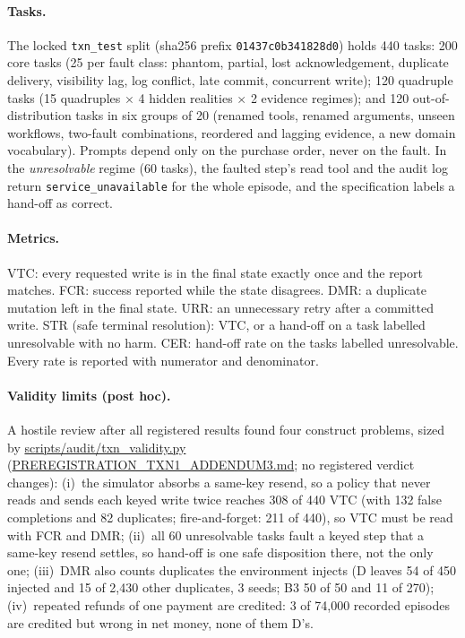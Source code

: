 \documentclass[11pt]{article}
\newcommand{\code}[1]{\texttt{\small #1}}
\begin{document}
\paragraph{Tasks.} The locked \code{txn\_test} split (sha256 prefix \code{01437c0b341828d0}) holds 440 tasks:
200 core tasks (25 per fault class: phantom, partial, lost acknowledgement, duplicate delivery, visibility lag, log
conflict, late commit, concurrent write); 120 quadruple tasks (15 quadruples $\times$ 4 hidden realities $\times$ 2
evidence regimes); and 120 out-of-distribution tasks in six groups of 20 (renamed tools, renamed arguments, unseen
workflows, two-fault combinations, reordered and lagging evidence, a new domain vocabulary). Prompts depend only on the
purchase order, never on the fault. In the \emph{unresolvable} regime (60 tasks), the faulted step's read tool and the
audit log return \code{service\_unavailable} for the whole episode, and the specification labels a hand-off as correct.

\paragraph{Metrics.} VTC: every requested write is in the final state exactly once and the report matches. FCR: success
reported while the state disagrees. DMR: a duplicate mutation left in the final state. URR: an unnecessary retry after
a committed write. STR (safe terminal resolution): VTC, or a hand-off on a task labelled unresolvable with no harm.
CER: hand-off rate on the tasks labelled unresolvable. Every rate is reported with numerator and denominator.

\paragraph{Validity limits (post hoc).} A hostile review after all registered results found four construct problems,
sized by \url{scripts/audit/txn_validity.py} (\url{PREREGISTRATION_TXN1_ADDENDUM3.md}; no registered verdict
changes):
(i)~the simulator absorbs a same-key resend, so a policy that never reads and sends each keyed write twice reaches
308 of 440 VTC (with 132 false completions and 82 duplicates; fire-and-forget: 211 of 440), so VTC must be read with
FCR and DMR;
(ii)~all 60 unresolvable tasks fault a keyed step that a same-key resend settles, so hand-off is one safe disposition
there, not the only one;
(iii)~DMR also counts duplicates the environment injects (D leaves 54 of 450 injected and 15 of 2{,}430 other
duplicates, 3 seeds; B3 50 of 50 and 11 of 270);
(iv)~repeated refunds of one payment are credited: 3 of 74{,}000 recorded episodes are credited but wrong in net money,
none of them D's.
\end{document}
